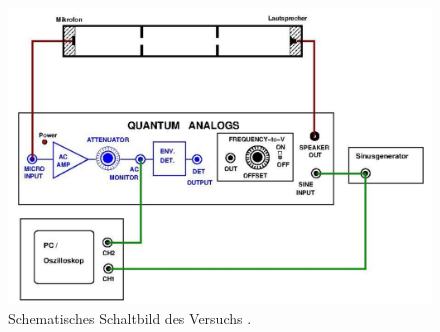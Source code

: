 \begin{figure}
  \centering
  \includegraphics[width=\textwidth]{data/schaltung.png}
  \caption{Schematisches Schaltbild des Versuchs \cite{Versuchsanleitung}.}
  \label{fig:schaltung}
\end{figure}

